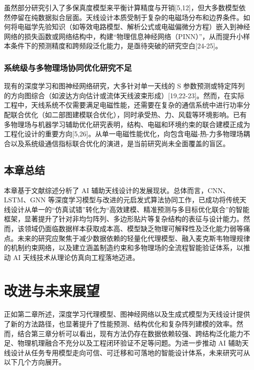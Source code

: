 \documentclass[UTF8,a4paper,12pt]{ctexart}
\begin{document}
虽然部分研究引入了多保真度模型来平衡计算精度与开销[5,12]，但大多数模型依然停留在纯数据拟合层面。天线设计本质受制于复杂的电磁场分布和边界条件。如何将电磁学先验知识（如等效电路模型、解析公式或电磁偏微分方程）嵌入到神经网络的损失函数或网络结构中，构建“物理信息神经网络（PINN）”，从而提升小样本条件下的预测精度和跨频段泛化能力，是亟待突破的研究空白[24-25]。

\subsubsection{系统级与多物理场协同优化研究不足}

现有的深度学习和图神经网络研究，大多针对单一天线的 S 参数预测或特定阵列的方向图综合（如波达方向估计或流体天线波束形成）[19,22-23]。然而，在实际工程中，天线系统不仅需要满足电磁性能，还需要在复杂的通信系统中进行功率分配联合优化（如二部图建模联合优化），同时承受热、力、风载等环境影响。已有多物理场与机器学习辅助优化研究表明，结构、电磁和环境约束的联合建模正成为工程化设计的重要方向[5,26]。从单一电磁性能优化，向包含电磁-热-力多物理场耦合以及系统级通信指标联合优化的演进，是当前研究尚未全面覆盖的盲区。

\subsection{本章总结}

本章基于文献综述分析了 AI 辅助天线设计的发展现状。总体而言，CNN、LSTM、GNN 等深度学习模型与改进的元启发式算法协同工作，已成功将传统天线设计从单一的“仿真试错”转化为“高效建模、精准预测与多目标优化联合”的智能框架，显著提升了针对非均匀阵列、多边形贴片等复杂结构的表征与设计能力。然而，该领域仍面临数据样本获取成本高、模型缺乏物理可解释性及泛化能力弱等痛点。未来的研究应聚焦于减少数据依赖的轻量化代理模型、融入麦克斯韦物理规律的机制约束网络，以及建立涵盖制造约束和多物理场的全流程智能验证体系，以推动 AI 天线技术从理论仿真向工程落地迈进。

\section{改进与未来展望}

正如第二章所述，深度学习代理模型、图神经网络以及生成式模型为天线设计提供了新的方法路径，也显著提升了性能预测、结构优化和复杂阵列建模的效率。然而，结合第三章分析可以看出，现有方法仍存在数据依赖较强、跨结构泛化能力不足、物理机理融合不充分以及工程闭环验证不足等问题。为进一步推动 AI 辅助天线设计从任务专用模型走向可信、可迁移和可落地的智能设计体系，未来研究可从以下几个方向展开。
\end{document}
